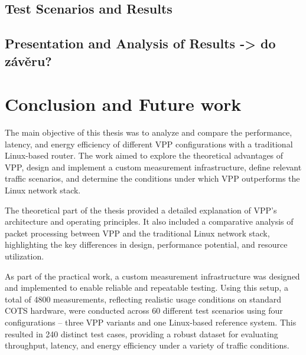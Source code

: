 \section{Test Scenarios and Results}





\section{Presentation and Analysis of Results -> do závěru?}



\chapter{Conclusion and Future work}
The main objective of this thesis was to analyze and compare the performance, latency, and energy efficiency of different VPP configurations with a traditional Linux-based router. 
The work aimed to explore the theoretical advantages of VPP, design and implement a custom measurement infrastructure, define relevant traffic scenarios, 
and determine the conditions under which VPP outperforms the Linux network stack.

The theoretical part of the thesis provided a detailed explanation of VPP's architecture and operating principles. 
It also included a comparative analysis of packet processing between VPP and the traditional Linux network stack, highlighting the key differences in design, performance potential, and resource utilization.

As part of the practical work, a custom measurement infrastructure was designed and implemented to enable reliable and repeatable testing. 
Using this setup, a total of 4800 measurements, reflecting realistic usage conditions on standard COTS hardware, 
were conducted across 60 different test scenarios using four configurations -- three VPP variants and one Linux-based reference system.
This resulted in 240 distinct test cases, providing a robust dataset for evaluating throughput, latency, and energy efficiency under a variety of traffic conditions.

